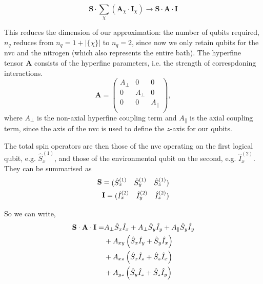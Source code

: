 \begin{equation}
    \mathbf{S} \cdot \sum_{\chi} \left( \mathbf{A}_{\chi} \cdot \mathbf{I}_{\chi} \right)
    \rightarrow 
    \mathbf{S} \cdot \mathbf{A} \cdot \mathbf{I} 
\end{equation}

This reduces the dimension of our approximation: 
    the number of qubits required, $n_q$ 
    reduces from $n_q = 1 + |\{\chi\}|$ to $n_q = 2$, 
    since now we only retain qubits for the \gls{nvc} and the \gls{nitrogen} 
    (which also represents the entire bath).
The hyperfine tensor $\mathbf{A}$ consists of the hyperfine parameters, 
    i.e. the strength of correspdoning interactions. 
\begin{equation}
    \mathbf{A} = 
    \begin{pmatrix}
        A_{\perp} & 0 & 0 \\    
        0 & A_{\perp} & 0 \\
        0 & 0 & A_{\|} \\
    \end{pmatrix},
\end{equation}
    where $A_{\perp}$ is the non-axial hyperfine coupling term and $A_{\|}$ is the axial coupling term, 
    since the axis of the \gls{nvc} is used to define the $z$-axis for our qubits. 

The total spin operators are then those of the \gls{nvc} operating on the first logical qubit, e.g. $\hat{S}^{(1)}_x$,
    and those of the environmental qubit on the second, e.g. $\hat{I}_x^{(2)}$. 
They can be summarised as
\begin{equation}
    \label{total_spin_operators}
    \begin{split}
    \mathbf{S} = \begin{matrix}( \hat{S}_x^{(1)}  & \hat{S}_y^{(1)} & \hat{S}_z^{(1)} )\end{matrix} \\
    \mathbf{I} = \begin{matrix}( \hat{I}_x^{(2)} & \hat{I}_y^{(2)} & \hat{I}_z^{(2)}  )\end{matrix} 
    \end{split}
\end{equation}

So we can write, 
\begin{equation}
    \begin{split}
        \mathbf{S} \cdot \mathbf{A} \cdot \mathbf{I} 
        = &A_{\perp} \hat{S}_x \hat{I}_x + A_{\perp} \hat{S}_y \hat{I}_y + A_{\|} \hat{S}_y \hat{I}_y \\
        &+ A_{xy} \left( \hat{S}_x \hat{I}_y + \hat{S}_y \hat{I}_x \right) \\
        &+ A_{xz} \left( \hat{S}_x \hat{I}_z + \hat{S}_z \hat{I}_x \right) \\
        &+ A_{yz} \left( \hat{S}_y \hat{I}_z + \hat{S}_z \hat{I}_y \right) \\
    \end{split}
\end{equation}

